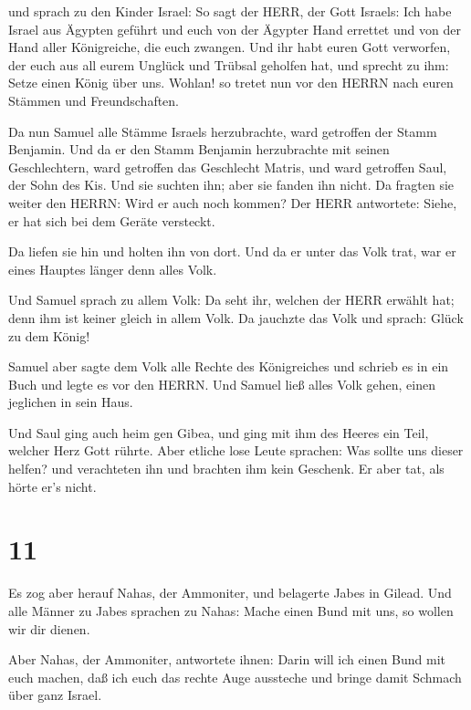  und sprach zu den Kinder Israel: So sagt der HERR, der
Gott Israels: Ich habe Israel aus Ägypten geführt und euch von der
Ägypter Hand errettet und von der Hand aller Königreiche, die euch
zwangen.  Und ihr habt euren Gott verworfen, der euch aus
all eurem Unglück und Trübsal geholfen hat, und sprecht zu ihm: Setze
einen König über uns. Wohlan! so tretet nun vor den HERRN nach euren
Stämmen und Freundschaften.

 Da nun Samuel alle Stämme Israels herzubrachte, ward
getroffen der Stamm Benjamin.  Und da er den Stamm Benjamin
herzubrachte mit seinen Geschlechtern, ward getroffen das Geschlecht
Matris, und ward getroffen Saul, der Sohn des Kis. Und sie suchten ihn;
aber sie fanden ihn nicht.  Da fragten sie weiter den
HERRN: Wird er auch noch kommen? Der HERR antwortete: Siehe, er hat sich
bei dem Geräte versteckt.

 Da liefen sie hin und holten ihn von dort. Und da er unter
das Volk trat, war er eines Hauptes länger denn alles Volk.

 Und Samuel sprach zu allem Volk: Da seht ihr, welchen der
HERR erwählt hat; denn ihm ist keiner gleich in allem Volk. Da jauchzte
das Volk und sprach: Glück zu dem König!

 Samuel aber sagte dem Volk alle Rechte des Königreiches
und schrieb es in ein Buch und legte es vor den HERRN. Und Samuel ließ
alles Volk gehen, einen jeglichen in sein Haus.

 Und Saul ging auch heim gen Gibea, und ging mit ihm des
Heeres ein Teil, welcher Herz Gott rührte.  Aber etliche
lose Leute sprachen: Was sollte uns dieser helfen? und verachteten ihn
und brachten ihm kein Geschenk. Er aber tat, als hörte er's nicht.

\hypertarget{section-10}{%
\section{11}\label{section-10}}

 Es zog aber herauf Nahas, der Ammoniter, und belagerte
Jabes in Gilead. Und alle Männer zu Jabes sprachen zu Nahas: Mache einen
Bund mit uns, so wollen wir dir dienen.

 Aber Nahas, der Ammoniter, antwortete ihnen: Darin will ich
einen Bund mit euch machen, daß ich euch das rechte Auge aussteche und
bringe damit Schmach über ganz Israel.

